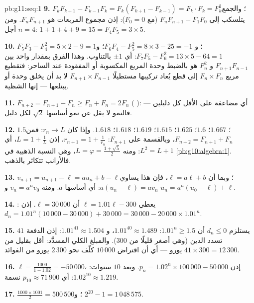 \begin{solution}{pb:g11:seq:1}
\textbf{9.} $F_k F_{k+1} - F_{k-1} F_k = F_k (F_{k+1} -
F_{k-1}) = F_k \cdot F_k = F_k^2$؛ والجمع يتلسكب إلى
$F_n F_{n+1} - F_1 F_0$ (مع $F_0 = 0$): إذن مجموع المربعات هو
$F_n F_{n+1}$. ومن أجل $n = 4$: $1 + 1 + 4 + 9 = 15 = F_4 F_5 =
3 \times 5$.

\textbf{10.} $F_5 F_3 - F_4^2 = 5 \times 2 - 9 = 1$؛
و $F_6 F_4 - F_5^2 = 8 \times 3 - 25 = -1$؛
و $F_7 F_5 - F_6^2 = 13 \times 5 - 64 = 1$: أي $\pm 1$
بالتناوب. وهذا الفرق بمقدار واحد بين $F_{n+1} F_{n-1}$ و
$F_n^2$ هو بالضبط وحدة المربع المكسوبة أو المفقودة عند الساحر:
فتقطيع مربع $F_n \times F_n$ إلى قطع يُعاد تركيبها مستطيلًا
$F_{n+1} \times F_{n-1}$ لا بد أن يخلق وحدة أو يبتلعها --- إنها
الشظية.

\textbf{11.} $F_{n+2} = F_{n+1} + F_n \geq F_n + F_n = 2F_n$
( ): أي مضاعفة على الأقل كل دليلين ---
فالنمو لا يقل عن نمو  أساسها $\sqrt2$ لكل
دليل.

\textbf{12.} $1.5$؛ $1.667$؛ $1.6$؛ $1.625$؛ $1.615$؛
$1.619$؛ $1.618$؛ $1.618$. وإذا كان $r_n \to L$: فمن
$F_{n+2} = F_{n+1} + F_n$، وبالقسمة على $F_{n+1}$:
$r_{n+1} = 1 + \frac{1}{r_n}$، إذن $L = 1 + \frac1L$، أي
$L^2 = L + 1$: ومنه $L = \varphi = \frac{1 + \sqrt5}{2}$، وهي النسبة
الذهبية في \cref{pb:g10:algebra:1}. فالأرانب تتكاثر
بالذهب.

\textbf{13.} $v_{n+1} = u_{n+1} - \ell = a u_n + b - \ell$؛
وبما أن $\ell = a\ell + b$، فإن هذا يساوي $a(u_n - \ell) = a v_n$:
أي  أساسها $a$. ومنه $v_n = a^n v_0$ و
$u_n = a^n (u_0 - \ell) + \ell$.

\textbf{14.} : يعطي $\ell = 1.01\ell - 300$ أن
$\ell = 30\,000$. إذن
$d_n = 1.01^n (10\,000 - 30\,000) + 30\,000
= 30\,000 - 20\,000 \times 1.01^n$.

\textbf{15.} يستلزم $d_n \leq 0$ أن $1.01^n \geq 1.5$:
$1.01^{40} \approx 1.489$، و $1.01^{41} \approx 1.504$: إذن
الدفعة $41$ تسدد الدين (وهي أصغر قليلًا من
$300$). والمبلغ الكلي المسدَّد: أقل بقليل من $41 \times 300 = 12\,300$
يورو --- أي أن اقتراض $10\,000$ كلّف نحو $2\,300$ يورو من
الفوائد.

\textbf{16.}  $\ell = \frac{1000}{1 - 1.02} =
-50\,000$، إذن $p_n = 1.02^n \times 100\,000 - 50\,000$. وبعد
$10$ سنوات: $1.02^{10} \approx 1.219$:
أي $p_{10} \approx 71\,900$ نسمة.

\textbf{17.} $\frac{1000 \times 1001}{2} = 500\,500$؛ و
$2^{20} - 1 = 1\,048\,575$.


\end{solution}
